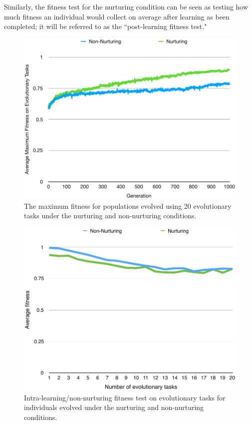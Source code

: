 \documentclass[master]{outhesis}
\begin{document}
Similarly, the fitness test for the nurturing condition can be seen as testing how much fitness an individual would collect on average after learning as been completed;
it will be referred to as the ``post-learning fitness test."

\begin{figure}[H]
	\centering
	\includegraphics{LearningInstinctsEvolution.pdf}
	\caption{The maximum fitness for populations evolved using 20 evolutionary tasks under the nurturing and non-nurturing conditions.}
	\label{fig:LearningInstinctsEvolution}
\end{figure}

\begin{figure}[H]
	\centering
	\includegraphics{NonNurturingFitnessTestPlot.pdf}
	\caption{Intra-learning/non-nurturing fitness test on evolutionary tasks for individuals evolved under the nurturing and non-nurturing conditions.}
\end{figure}
\end{document}
